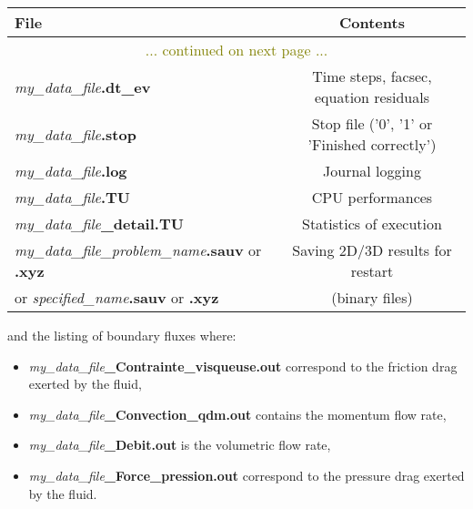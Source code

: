 \begin{longtable}{|l|c|}
\hline \textbf{File}                                    & \textbf{Contents} \\ \hline \hline \endhead
\hline\multicolumn{2}{|c|}{\textcolor{olive}{... continued on next page ...}}  \\ \hline \endfoot
\hline \endlastfoot
\textit{my\_data\_file}\textbf{.dt\_ev}                        & Time steps, facsec, equation residuals \\ \hline
\textit{my\_data\_file}\textbf{.stop}                          & Stop file ('0', '1' or 'Finished correctly') \\ \hline
\textit{my\_data\_file}\textbf{.log}                           & Journal logging  \\ \hline
\textit{my\_data\_file}\textbf{.TU}                            & CPU performances \\ \hline
\textit{my\_data\_file}\textbf{\_detail.TU}                    & Statistics of execution \\ \hline
\textit{my\_data\_file\_problem\_name}\textbf{.sauv} or \textbf{.xyz}      & Saving 2D/3D results for restart \\
or \textit{specified\_name}\textbf{.sauv} or \textbf{.xyz}                 & (binary files) \\ \hline
\end{longtable}

and the listing of boundary fluxes where:
\begin{itemize}
\item \textit{my\_data\_file}\textbf{\_Contrainte\_visqueuse.out} correspond to the friction drag exerted by the fluid,%
\item \textit{my\_data\_file}\textbf{\_Convection\_qdm.out} contains the momentum flow rate,
\item \textit{my\_data\_file}\textbf{\_Debit.out} is the volumetric flow rate,%
\item \textit{my\_data\_file}\textbf{\_Force\_pression.out} correspond to the pressure drag exerted by the fluid.%
\end{itemize}

